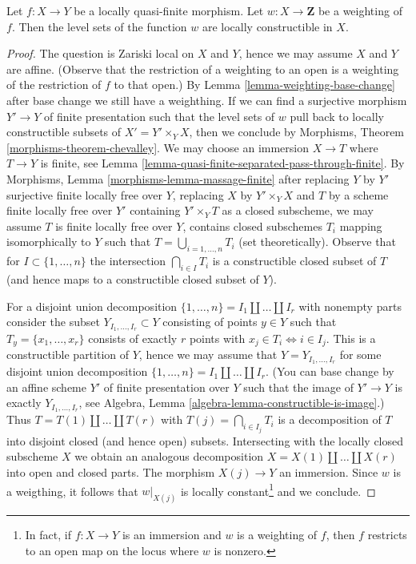 \begin{lemma}
\label{lemma-jumps-w}
Let $f : X \to Y$ be a locally quasi-finite morphism.
Let $w : X \to \mathbf{Z}$ be a weighting of $f$. Then
the level sets of the function $w$ are locally constructible in $X$.
\end{lemma}

\begin{proof}
The question is Zariski local on $X$ and $Y$, hence we may assume
$X$ and $Y$ are affine. (Observe that the restriction of a weighting
to an open is a weighting of the restriction of $f$ to that open.)
By Lemma \ref{lemma-weighting-base-change} after base change we still
have a weighthing. If we can find a surjective morphism
$Y' \to Y$ of finite presentation such that the level sets of
$w$ pull back to locally constructible subsets of $X' = Y' \times_Y X$,
then we conclude by Morphisms, Theorem \ref{morphisms-theorem-chevalley}.
We may choose an immersion $X \to T$ where $T \to Y$ is finite, see
Lemma \ref{lemma-quasi-finite-separated-pass-through-finite}.
By Morphisms, Lemma \ref{morphisms-lemma-massage-finite}
after replacing $Y$ by $Y'$ surjective finite locally free over $Y$,
replacing $X$ by $Y' \times_Y X$ and $T$ by a scheme finite locally
free over $Y'$ containing $Y' \times_Y T$ as a closed subscheme,
we may assume $T$ is finite locally free over $Y$,
contains closed subschemes $T_i$ mapping isomorphically to $Y$
such that $T = \bigcup_{i = 1, \ldots, n} T_i$ (set theoretically).
Observe that for $I \subset \{1, \ldots, n\}$ the intersection
$\bigcap_{i \in I} T_i$ is a constructible closed subset of $T$
(and hence maps to a constructible closed subset of $Y$).

\medskip\noindent
For a disjoint union decomposition
$\{1, \ldots, n\} = I_1 \amalg \ldots \amalg I_r$ with nonempty parts
consider the subset $Y_{I_1, \ldots, I_r} \subset Y$
consisting of points $y \in Y$ such that $T_y = \{x_1, \ldots, x_r\}$
consists of exactly $r$ points with $x_j \in T_i \Leftrightarrow i \in I_j$.
This is a constructible partition of $Y$, hence we may
assume that $Y = Y_{I_1, \ldots, I_r}$ for some
disjoint union decomposition
$\{1, \ldots, n\} = I_1 \amalg \ldots \amalg I_r$.
(You can base change by an affine scheme $Y'$ of finite presentation
over $Y$ such that the image of $Y' \to Y$ is exactly
$Y_{I_1, \ldots, I_r}$, see Algebra, Lemma
\ref{algebra-lemma-constructible-is-image}.)
Thus $T = T(1) \amalg \ldots \amalg T(r)$ with $T(j) = \bigcap_{i \in I_j} T_i$
is a decomposition of $T$ into disjoint closed (and hence open) subsets.
Intersecting with the locally closed subscheme $X$ we obtain an analogous
decomposition $X = X(1) \amalg \ldots \amalg X(r)$ into open and closed parts.
The morphism $X(j) \to Y$ an immersion.
Since $w$ is a weigthing, it follows that $w|_{X(j)}$
is locally constant\footnote{In fact, if $f : X \to Y$ is an
immersion and $w$ is a weighting of $f$, then $f$ restricts to an
open map on the locus where $w$ is nonzero.} and we conclude.
\end{proof}

